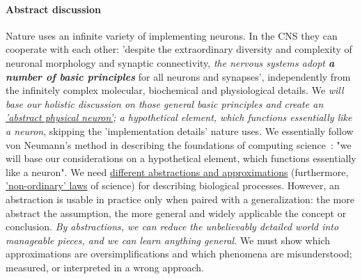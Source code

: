 \paragraph*{Abstract discussion}

Nature uses an infinite variety of implementing neurons. 
In the \gls{CNS} 
they can cooperate
with each other: 'despite the extraordinary diversity and complexity of neuronal morphology and synaptic connectivity,
\textit{the nervous systems adopt \textbf{a number of
 basic principles}}
for all neurons and synapses',
\cite{JohnstonWuNeurophysiology:1995}
independently from the infinitely complex molecular, biochemical and physiological details.
We \textit{will base our holistic discussion on those general basic principles 
and create an 
\hyperlink{NeuronPhysical}
{'abstract physical neuron'}; a hypothetical element, which functions
essentially like a neuron},
skipping the 'implementation details' nature uses.
We essentially follow von Neumann's method in describing the foundations of
computing science~\cite{EDVACreport1945}: "we will base our considerations on a hypothetical element, which functions essentially like a neuron".
We need \hyperlink{Abstractions}
{different abstractions and approximations} 
(furthermore, \hyperlink{NonOrdinaryLaws}{'non-ordinary' laws} of science) for describing biological processes.
However, an abstraction is usable
in practice only when paired with a generalization: the more abstract the assumption, the more general and widely applicable the concept or conclusion.
\textit{By abstractions, we can reduce the unbelievably detailed world into manageable pieces, and we can learn anything general.}
We must show which approximations are oversimplifications and which phenomena are misunderstood; measured, or interpreted in a wrong approach.



